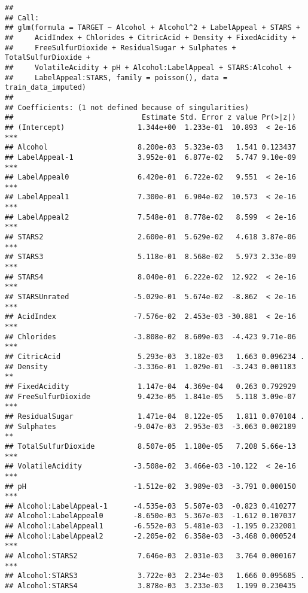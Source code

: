 \documentclass[
]{article}
\begin{document}
\begin{verbatim}
## 
## Call:
## glm(formula = TARGET ~ Alcohol + Alcohol^2 + LabelAppeal + STARS + 
##     AcidIndex + Chlorides + CitricAcid + Density + FixedAcidity + 
##     FreeSulfurDioxide + ResidualSugar + Sulphates + TotalSulfurDioxide + 
##     VolatileAcidity + pH + Alcohol:LabelAppeal + STARS:Alcohol + 
##     LabelAppeal:STARS, family = poisson(), data = train_data_imputed)
## 
## Coefficients: (1 not defined because of singularities)
##                              Estimate Std. Error z value Pr(>|z|)    
## (Intercept)                 1.344e+00  1.233e-01  10.893  < 2e-16 ***
## Alcohol                     8.200e-03  5.323e-03   1.541 0.123437    
## LabelAppeal-1               3.952e-01  6.877e-02   5.747 9.10e-09 ***
## LabelAppeal0                6.420e-01  6.722e-02   9.551  < 2e-16 ***
## LabelAppeal1                7.300e-01  6.904e-02  10.573  < 2e-16 ***
## LabelAppeal2                7.548e-01  8.778e-02   8.599  < 2e-16 ***
## STARS2                      2.600e-01  5.629e-02   4.618 3.87e-06 ***
## STARS3                      5.118e-01  8.568e-02   5.973 2.33e-09 ***
## STARS4                      8.040e-01  6.222e-02  12.922  < 2e-16 ***
## STARSUnrated               -5.029e-01  5.674e-02  -8.862  < 2e-16 ***
## AcidIndex                  -7.576e-02  2.453e-03 -30.881  < 2e-16 ***
## Chlorides                  -3.808e-02  8.609e-03  -4.423 9.71e-06 ***
## CitricAcid                  5.293e-03  3.182e-03   1.663 0.096234 .  
## Density                    -3.336e-01  1.029e-01  -3.243 0.001183 ** 
## FixedAcidity                1.147e-04  4.369e-04   0.263 0.792929    
## FreeSulfurDioxide           9.423e-05  1.841e-05   5.118 3.09e-07 ***
## ResidualSugar               1.471e-04  8.122e-05   1.811 0.070104 .  
## Sulphates                  -9.047e-03  2.953e-03  -3.063 0.002189 ** 
## TotalSulfurDioxide          8.507e-05  1.180e-05   7.208 5.66e-13 ***
## VolatileAcidity            -3.508e-02  3.466e-03 -10.122  < 2e-16 ***
## pH                         -1.512e-02  3.989e-03  -3.791 0.000150 ***
## Alcohol:LabelAppeal-1      -4.535e-03  5.507e-03  -0.823 0.410277    
## Alcohol:LabelAppeal0       -8.650e-03  5.367e-03  -1.612 0.107037    
## Alcohol:LabelAppeal1       -6.552e-03  5.481e-03  -1.195 0.232001    
## Alcohol:LabelAppeal2       -2.205e-02  6.358e-03  -3.468 0.000524 ***
## Alcohol:STARS2              7.646e-03  2.031e-03   3.764 0.000167 ***
## Alcohol:STARS3              3.722e-03  2.234e-03   1.666 0.095685 .  
## Alcohol:STARS4              3.878e-03  3.233e-03   1.199 0.230435    

\end{verbatim}
\end{document}
